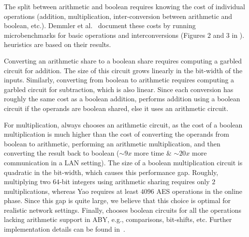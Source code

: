 The split
between arithmetic and boolean requires knowing the cost of
individual operations
(addition, multiplication, inter-conversion between arithmetic and boolean, etc.).
Demmler
et al.~\cite{aby} document these costs by running
microbenchmarks for basic operations and interconversions (Figures
2 and 3 in \cite{aby}). \tool heuristics are based on their results.

 Converting
an arithmetic share to a boolean share requires computing a garbled
circuit for addition. The size of this circuit grows  linearly in the bit-width of the inputs. Similarly, converting from boolean to arithmetic requires computing a 
garbled circuit for subtraction, which is also linear. 
Since each conversion has roughly the same cost as a boolean addition,
 \tool performs
addition using a boolean circuit
if the operands  are boolean shared, else it uses an arithmetic
circuit. 

For multiplication, \tool always chooses
an arithmetic circuit, as the cost of a boolean multiplication is much
higher than the cost of converting the operands from boolean to
arithmetic, performing an arithmetic multiplication, and then converting
the result back to boolean ($\sim9x$ more time $\&$ $\sim20x$ more
communication in a LAN setting). The size of a boolean multiplication circuit is quadratic in the bit-width, which causes this performance gap.
Roughly, multiplying two $64$-bit integers using arithmetic sharing requires only $2$ multiplications, whereas Yao requires at least $4096$ AES operations in the online phase.
Since this gap is quite large, we believe that this choice is optimal for realistic network
settings. Finally, \tool chooses boolean circuits for all
the operations lacking arithmetic support in ABY, e.g., comparisons, bit-shifts, etc.
Further implementation details can be found in~.


